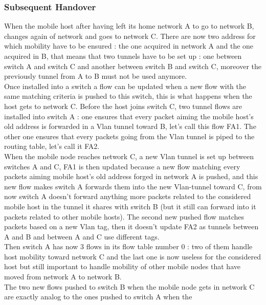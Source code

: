 \documentclass{article}
\begin{document}
\subsubsection{Subsequent Handover}

When the mobile host after having left its home network A to go to
network B, changes again of network and goes to network C. There are
now two address for which mobility have to be ensured : the one
acquired in network A and the one acquired in B, that means that two
tunnels have to be set up : one between switch A and switch C and
another between switch B and switch C, moreover the previously tunnel
from A to B must not be used anymore.\\
\newline
 Once installed into a switch a flow can be updated when a new flow
with the same matching criteria is pushed to this switch, this is
what happens when the host gets to network C. Before the host joins
switch C, two tunnel flows are installed into switch A : one ensures
that every packet aiming the mobile host's old address is forwarded in
a Vlan tunnel toward B, let's call this flow FA1. The other one
ensures that every packets going from the Vlan tunnel is piped to the
routing table, let's call it FA2.\\
\newline
When the mobile node reaches network C, a new Vlan tunnel is set up
between switches A and C, FA1 is then updated because a new flow
matching every packets aiming mobile host's old address forged in
network A is pushed, and this new flow makes switch A forwards them
into the new Vlan-tunnel toward C, from now switch A doesn't forward
anything more packets related to the considered mobile host in the tunnel
it shares with switch B (but it still can forward into it packets
related to other mobile hosts). The second new pushed flow matches
packets based on a new Vlan tag, then it doesn't update FA2 as tunnels
between A and B and between A and C use different tags. \\
\newline
Then switch A has now 3 flows in its flow table number 0 : two of them
handle host mobility toward network C and the last one is now useless
for the considered host but still important to handle mobility of
other mobile nodes that have moved from network A to network B.\\
\newline
The two new flows pushed to switch B when the mobile node gets in
network C are exactly analog to the ones pushed to switch A when the
\end{document}
